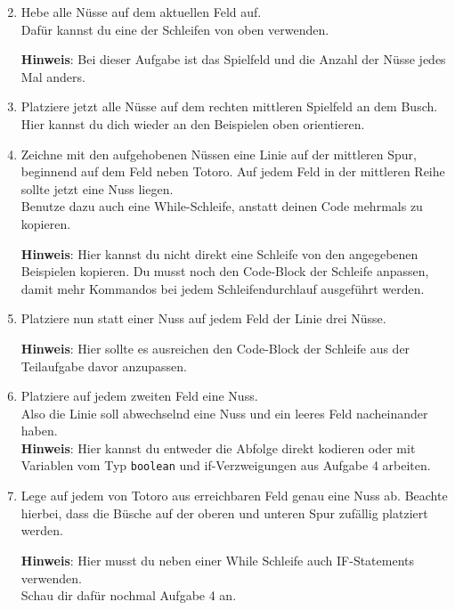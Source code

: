 \begin{enumerate} \setcounter{enumi}{1}
    \item Hebe alle Nüsse auf dem aktuellen Feld auf.\\
    Dafür kannst du eine der Schleifen von oben verwenden.
    
    \textbf{Hinweis}: Bei dieser Aufgabe ist das Spielfeld und die Anzahl der Nüsse jedes Mal anders.
    \item Platziere jetzt alle Nüsse auf dem rechten mittleren Spielfeld an dem Busch.
    Hier kannst du dich wieder an den Beispielen oben orientieren.
    \item Zeichne mit den aufgehobenen Nüssen eine Linie auf der mittleren Spur, beginnend auf dem Feld neben Totoro.
    Auf jedem Feld in der mittleren Reihe sollte jetzt eine Nuss liegen.\\
    Benutze dazu auch eine While-Schleife, anstatt deinen Code mehrmals zu kopieren.
    
    \textbf{Hinweis}: Hier kannst du nicht direkt eine Schleife von den angegebenen Beispielen kopieren.
    Du musst noch den Code-Block der Schleife anpassen, damit mehr Kommandos bei jedem Schleifendurchlauf ausgeführt werden.
    \item Platziere nun statt einer Nuss auf jedem Feld der Linie drei Nüsse.
    
    \textbf{Hinweis}: Hier sollte es ausreichen den Code-Block der Schleife aus der Teilaufgabe davor anzupassen.
    \item Platziere auf jedem zweiten Feld eine Nuss.\\
    Also die Linie soll abwechselnd eine Nuss und ein leeres Feld nacheinander haben.\\
    
    \textbf{Hinweis}: Hier kannst du entweder die Abfolge direkt kodieren oder mit Variablen vom Typ \lstinline{boolean} und if-Verzweigungen aus Aufgabe 4 arbeiten.
    \item \optional Lege auf jedem von Totoro aus erreichbaren Feld genau eine Nuss ab.
    Beachte hierbei, dass die Büsche auf der oberen und unteren Spur zufällig platziert werden.
    
    \textbf{Hinweis}: Hier musst du neben einer While Schleife auch IF-Statements verwenden.\\
    Schau dir dafür nochmal Aufgabe 4 an.
\end{enumerate}
